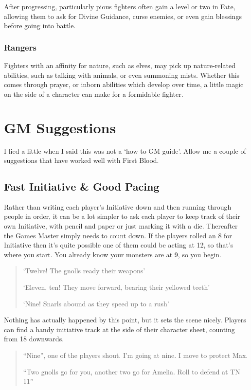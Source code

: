 After progressing, particularly pious fighters often gain a level or two in Fate, allowing them to ask for Divine Guidance, curse enemies, or even gain blessings before going into battle.

\subsubsection{Rangers}

Fighters with an affinity for nature, such as elves, may pick up nature-related abilities, such as talking with animals, or even summoning mists.  Whether this comes through prayer, or inborn abilities which develop over time, a little magic on the side of a character can make for a formidable fighter.


\section{GM Suggestions}
I lied a little when I said this was not a `how to GM guide'.  Allow me a couple of suggestions that have worked well with First Blood.

\subsection{Fast Initiative \& Good Pacing}

Rather than writing each player's Initiative down and then running through people in order, it can be a lot simpler to ask each player to keep track of their own Initiative, with pencil and paper or just marking it with a die. Thereafter the Games Master simply needs to count down. If the players rolled an 8 for Initiative then it's quite possible one of them could be acting at 12, so that's where you start. You already know your monsters are at 9, so you begin.

\begin{quote}
`Twelve! The gnolls ready their weapons'

`Eleven, ten! They move forward, bearing their yellowed teeth'

`Nine! Snarls abound as they speed up to a rush'
\end{quote}

Nothing has actually happened by this point, but it sets the scene nicely.  Players can find a handy initiative track at the side of their character sheet, counting from 18 downwards.

\begin{quote}
``Nine'', one of the players shout.  I'm going at nine.  I move to protect Max.

``Two gnolls go for you, another two go for Amelia.  Roll to defend at TN 11''

\end{quote}

